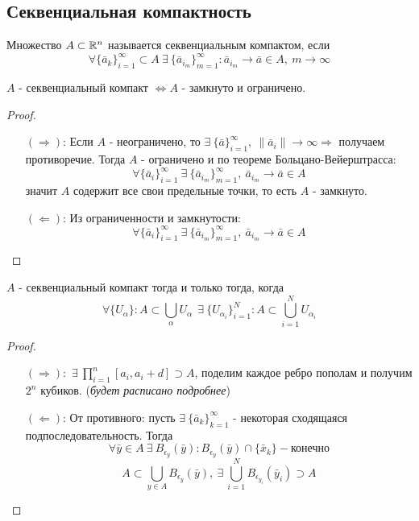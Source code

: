 \subsection{Секвенциальная компактность}
\begin{definition}
    Множество $A\subset \mathbb{R}^n$ называется секвенциальным компактом, если 
    \[\forall \{\bar{a}_k\}_{i=1}^{\infty}\subset A\ \exists\ \{\bar{a}_{i_m}\}_{m=1}^{\infty}: \bar{a}_{i_m}\to \bar{a} \in A,\ m\to \infty\]
\end{definition}  
\begin{theorem}
    $A$ - секвенциальный компакт $\Leftrightarrow A$ - замкнуто и ограничено. 
\end{theorem}
\begin{proof}\tab
    \begin{itemize}
        \item[$(\Rightarrow)$:] Если $A$ - неограничено, то $\exists\ \{\bar{a}\}_{i=1}^{\infty},\ \|\bar{a}_i\|\to \infty \Rightarrow$ получаем противоречие.
        Тогда $A$ - ограничено и по теореме Больцано-Вейерштрасса:
        \[\forall \{\bar{a}_i\}_{i=1}^{\infty}\ \exists\ \{\bar{a}_{i_m}\}_{m=1}^{\infty},\ \bar{a}_{i_m} \to \bar{a}\in A\]
        значит $A$ содержит все свои предельные точки, то есть $A$ - замкнуто.
        \item[$(\Leftarrow)$:] Из ограниченности и замкнутости:
        \[\forall \{\bar{a}_i\}_{i=1}^{\infty}\ \exists\ \{\bar{a}_{i_m}\}_{m=1}^{\infty},\ \bar{a}_{i_m} \to \bar{a}\in A\]
    \end{itemize}
\end{proof} 
\begin{theorem}
    $A$ - секвенциальный компакт тогда и только тогда, когда
    \[\forall \{U_{\alpha}\}: A\subset \bigcup_{\alpha}U_{\alpha}\ \ \exists\ \{U_{\alpha_i}\}_{i=1}^N: A\subset \bigcup_{i=1}^N U_{\alpha_i}\]
\end{theorem} 
\begin{proof}\tab
    \begin{itemize}
        \item[$(\Rightarrow):$] $\exists\ \prod\limits_{i=1}^{n}[a_i, a_i+d]\supset A$, поделим каждое ребро пополам и получим $2^n$ кубиков.
        (\textit{будет расписано подробнее})
        \item[$(\Leftarrow)$:] От противного: пусть $\exists\ \{\bar{a}_k\}_{k=1}^{\infty}$ - некоторая сходящаяся подпоследовательность. Тогда 
        \[\forall \bar{y}\in A\ \exists\ B_{\epsilon_y}(\bar{y}): B_{\epsilon_y}(\bar{y})\cap \{\bar{x}_k\} - \text{конечно}\]
        \[A\subset \bigcup_{y\in A}B_{\epsilon_y}(\bar{y}),\ \exists\ \bigcup_{i=1}^N B_{\epsilon_{y_i}}(\bar{y}_i)\supset A\]
    \end{itemize}
\end{proof} 
